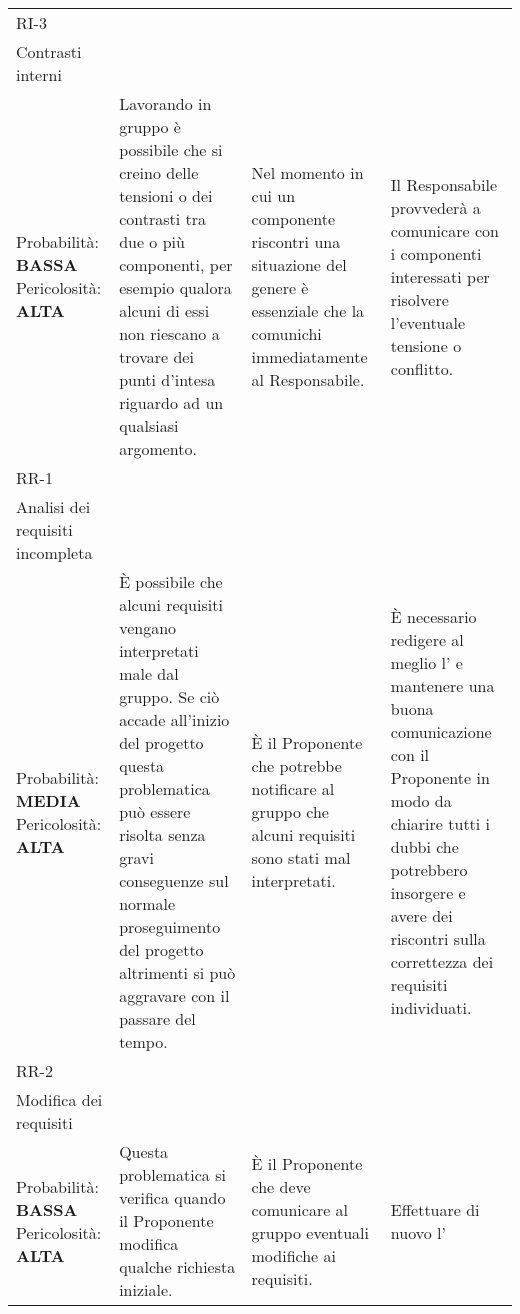 \begin{longtable}{
		>{\centering}p{}
		>{\centering}p{}
		>{\centering}p{}
		>{\centering\arraybackslash}p{} }
	\rowcolor{darkRowColor}
	RI-3 \\ Contrasti interni \\
		\vspace{5mm} %
		Probabilità: \textbf{BASSA} Pericolosità: \textbf{ALTA} &
		Lavorando in gruppo è possibile che si creino delle tensioni o dei contrasti tra due o più componenti, per esempio qualora alcuni di essi non riescano a trovare dei punti d'intesa riguardo ad un qualsiasi argomento.
		&
		Nel momento in cui un componente riscontri una situazione del genere è essenziale che la comunichi immediatamente al Responsabile.
		&
		Il Responsabile provvederà a comunicare con i componenti interessati per risolvere l'eventuale tensione o conflitto. \\

	\rowcolor{lightRowColor}
	RR-1 \\ Analisi dei requisiti incompleta \\
		\vspace{5mm} %
		Probabilità: \textbf{MEDIA} Pericolosità: \textbf{ALTA} &
		È possibile che alcuni requisiti vengano interpretati male dal gruppo. Se ciò accade all'inizio del progetto questa problematica può essere risolta senza gravi conseguenze sul normale proseguimento del progetto altrimenti si può aggravare con il passare del tempo.
		&
		È il Proponente\ped{\textit{G}} che potrebbe notificare al gruppo che alcuni requisiti sono stati mal interpretati.
		&
		È necessario redigere al meglio l'\textit{\AdR} e mantenere una buona comunicazione con il Proponente\ped{\textit{G}} in modo da chiarire tutti i dubbi che potrebbero insorgere e avere dei riscontri sulla correttezza dei requisiti individuati. \\

	\rowcolor{darkRowColor}
		RR-2 \\ Modifica dei requisiti \\
		\vspace{5mm} %
		Probabilità: \textbf{BASSA} Pericolosità: \textbf{ALTA} &
		Questa problematica si verifica quando il Proponente\ped{\textit{G}} modifica qualche richiesta iniziale.
		&
		È il Proponente\ped{\textit{G}} che deve comunicare al gruppo eventuali modifiche ai requisiti.
		&
		Effettuare di nuovo l'\textit{\AdR} \\


\end{longtable}
